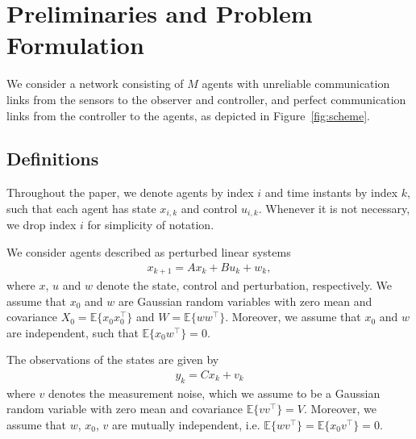 \documentclass[letterpaper, 10 pt, conference]{ieeeconf}  %
\newcommand{\E}{\mathbb{E}}
\begin{document}
%
%
%
%
\section{Preliminaries and Problem Formulation}
\label{sec:formulation}

We consider a network consisting of $M$ agents with unreliable communication links from the sensors to the observer and controller, and perfect communication links from the controller to the agents, as depicted in Figure~\ref{fig:scheme}.





\subsection{Definitions}
Throughout the paper, we denote agents by index $i$ and time instants by index $k$, such that each agent has state $x_{i,k}$ and control $u_{i,k}$. Whenever it is not necessary, we drop index $i$ for simplicity of notation.

We consider agents described as perturbed linear systems %
\begin{align}\label{eq:plant}
x_{k+1} = Ax_k + Bu_k + w_k,
\end{align}
where $x$, $u$ and $w$ denote the state, control and perturbation, respectively. We assume that $x_0$ and $w$ are Gaussian random variables with zero mean and covariance $X_0=\E\{x_0x_0^\top\}$ and $W=\E\{ww^\top\}$. Moreover, we assume that $x_0$ and $w$ are independent, such that $\E\{x_0w^\top\}=0$.

The observations of the states are given by
\begin{align}\label{eq:sensor}
y_k=Cx_k+v_k
\end{align}
where $v$ denotes the measurement noise, which we assume to be a Gaussian random variable with zero mean and covariance $\E\{vv^\top\}=V$. Moreover, we assume that $w$, $x_0$, $v$ are mutually independent, i.e. $\E\{wv^\top\}=\E\{x_0 v^\top\}=0$.

\end{document}
